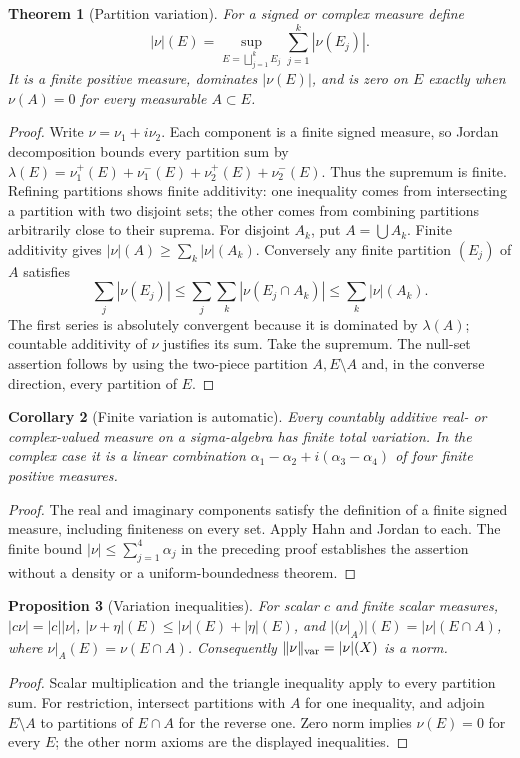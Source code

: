 \documentclass[11pt,oneside,openany]{book}
\newtheorem{theorem}{Theorem}[chapter]
\newtheorem{proposition}[theorem]{Proposition}
\newtheorem{corollary}[theorem]{Corollary}
\theoremstyle{definition}
\theoremstyle{remark}
\newcommand{\family}[1]{}
\begin{document}
\begin{theorem}[Partition variation]\family{D11.14.total_variation}\label{d11:14:total-variation}
For a signed or complex measure define
\[
 |\nu|(E)=\sup_{E=\bigsqcup_{j=1}^kE_j}\sum_{j=1}^k|\nu(E_j)|.
\]
It is a finite positive measure, dominates $|\nu(E)|$, and is zero on $E$
exactly when $\nu(A)=0$ for every measurable $A\subset E$.
\end{theorem}
\begin{proof}
Write $\nu=\nu_1+i\nu_2$. Each component is a finite signed measure, so
Jordan decomposition bounds every partition sum by
$\lambda(E)=\nu_1^+(E)+\nu_1^-(E)+\nu_2^+(E)+\nu_2^-(E)$.
Thus the supremum is finite. Refining partitions shows finite additivity:
one inequality comes from intersecting a partition with two disjoint sets;
the other comes from combining partitions arbitrarily close to their suprema.
For disjoint $A_k$, put $A=\bigcup A_k$. Finite additivity gives
$|\nu|(A)\geq\sum_k|\nu|(A_k)$. Conversely any finite partition $(E_j)$ of
$A$ satisfies
\[
 \sum_j|\nu(E_j)|\leq\sum_j\sum_k|\nu(E_j\cap A_k)|
 \leq\sum_k|\nu|(A_k).
\]
The first series is absolutely convergent because it is dominated by
$\lambda(A)$; countable additivity of $\nu$ justifies its sum. Take the
supremum. The null-set assertion follows by using the two-piece partition
$A,E\setminus A$ and, in the converse direction, every partition of $E$.
\end{proof}

\begin{corollary}[Finite variation is automatic]\family{D11.14.complex_finite_variation}\label{d11:14:complex-finite-variation}
Every countably additive real- or complex-valued measure on a sigma-algebra
has finite total variation. In the complex case it is a linear combination
$\alpha_1-\alpha_2+i(\alpha_3-\alpha_4)$ of four finite positive measures.
\end{corollary}
\begin{proof}
The real and imaginary components satisfy the definition of a finite signed
measure, including finiteness on every set. Apply Hahn and Jordan to each.
The finite bound $|\nu|\leq\sum_{j=1}^4\alpha_j$ in the preceding proof
establishes the assertion without a density or a uniform-boundedness theorem.
\end{proof}

\begin{proposition}[Variation inequalities]\family{D11.14.variation_inequalities}\label{d11:14:variation-inequalities}
For scalar $c$ and finite scalar measures,
$|c\nu|=|c||\nu|$, $|\nu+\eta|(E)\leq|\nu|(E)+|\eta|(E)$, and
$|(\nu|_A)|(E)=|\nu|(E\cap A)$, where $\nu|_A(E)=\nu(E\cap A)$.
Consequently $\|\nu\|_{\rm var}=|\nu|(X)$ is a norm.
\end{proposition}
\begin{proof}
Scalar multiplication and the triangle inequality apply to every partition
sum. For restriction, intersect partitions with $A$ for one inequality, and
adjoin $E\setminus A$ to partitions of $E\cap A$ for the reverse one.
Zero norm implies $\nu(E)=0$ for every $E$; the other norm axioms are the
displayed inequalities.
\end{proof}
\end{document}
